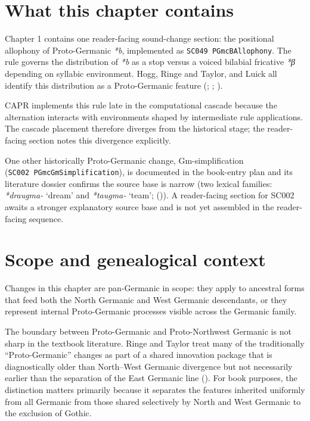 \documentclass[
  british,
  a4paper,
  openany]{book}
\providecommand{\Recon}[1]{\emph{*#1}}
{\catcode`→=\active \global\def→{\ensuremath{\rightarrow}}}
\providecommand{\Recon}[1]{\emph{*#1}}
{\catcode`→=\active \global\def→{\ensuremath{\rightarrow}}}
\begin{document}
\section{What this chapter contains}\label{what-this-chapter-contains}

Chapter 1 contains one reader-facing sound-change section: the
positional allophony of Proto-Germanic \emph{*b}, implemented as
\texttt{SC049\ PGmcBAllophony}. The rule governs the distribution of
\emph{*b} as a stop versus a voiced bilabial fricative \emph{*β}
depending on syllabic environment. Hogg, Ringe and Taylor, and Luick all
identify this distribution as a Proto-Germanic feature
(;
;
).

CAPR implements this rule late in the computational cascade because the
alternation interacts with environments shaped by intermediate rule
applications. The cascade placement therefore diverges from the
historical stage; the reader-facing section notes this divergence
explicitly.

One other historically Proto-Germanic change, Gm-simplification
(\texttt{SC002\ PGmcGmSimplification}), is documented in the book-entry
plan and its literature dossier confirms the source base is narrow (two
lexical families:
\Recon{draugma-}
`dream' and
\Recon{taugma-}
`team'; ()). A
reader-facing section for SC002 awaits a stronger explanatory source
base and is not yet assembled in the reader-facing sequence.

\section{Scope and genealogical
context}\label{scope-and-genealogical-context}

Changes in this chapter are pan-Germanic in scope: they apply to
ancestral forms that feed both the North Germanic and West Germanic
descendants, or they represent internal Proto-Germanic processes visible
across the Germanic family.

The boundary between Proto-Germanic and Proto-Northwest Germanic is not
sharp in the textbook literature. Ringe and Taylor treat many of the
traditionally ``Proto-Germanic'' changes as part of a shared innovation
package that is diagnostically older than North--West Germanic
divergence but not necessarily earlier than the separation of the East
Germanic line (). For book purposes, the distinction matters primarily because it
separates the features inherited uniformly from all Germanic from those
shared selectively by North and West Germanic to the exclusion of
Gothic.
\end{document}

